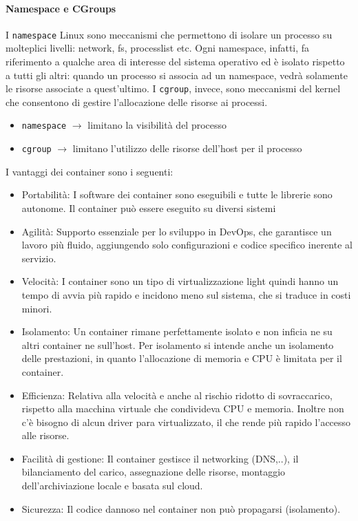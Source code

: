 \documentclass{article}
\begin{document}
		\paragraph{Namespace e CGroups}
		I \verb|namespace| Linux sono meccanismi che permettono di isolare un processo su molteplici livelli: network, fs, processlist etc.
		Ogni namespace, infatti, fa riferimento a qualche area di interesse del sistema operativo
		ed è isolato rispetto a tutti gli altri: quando un processo si associa ad un namespace, vedrà solamente le risorse associate a quest’ultimo.
		I \verb|cgroup|, invece, sono meccanismi del kernel che consentono di gestire l'allocazione delle risorse ai processi.
		\begin{itemize}
			\item \verb*|namespace| $\rightarrow$ limitano la visibilità del processo
			\item \verb*|cgroup| $\rightarrow$ limitano l'utilizzo delle risorse dell'host per il processo
		\end{itemize} 
		I vantaggi dei container sono i seguenti:
		\begin{itemize}
		    \item Portabilità: I software dei container sono eseguibili e tutte le librerie sono autonome. Il container può essere eseguito su diversi sistemi
		    \item Agilità: Supporto essenziale per lo sviluppo in DevOps, che garantisce un lavoro più fluido, aggiungendo solo configurazioni e codice specifico inerente al servizio.
		    \item Velocità: I container sono un tipo di virtualizzazione light quindi hanno un tempo di avvia più rapido e incidono meno sul sistema, che si traduce in costi minori.
		    \item Isolamento: Un container rimane perfettamente isolato e non inficia ne su altri container ne sull'host. Per isolamento si intende anche un isolamento delle prestazioni, in quanto l'allocazione di memoria e CPU è limitata per il container.
		    \item Efficienza: Relativa alla velocità e anche al rischio ridotto di sovraccarico, rispetto alla macchina virtuale che condivideva CPU e memoria. Inoltre non c'è bisogno di alcun driver para virtualizzato, il che rende più rapido l'accesso alle risorse.
		    \item Facilità di gestione: Il container gestisce il networking (DNS,..), il bilanciamento del carico, assegnazione delle risorse, montaggio dell'archiviazione locale e basata sul cloud.
		    \item Sicurezza: Il codice dannoso nel container non può propagarsi (isolamento).
		\end{itemize}
	
\end{document}
